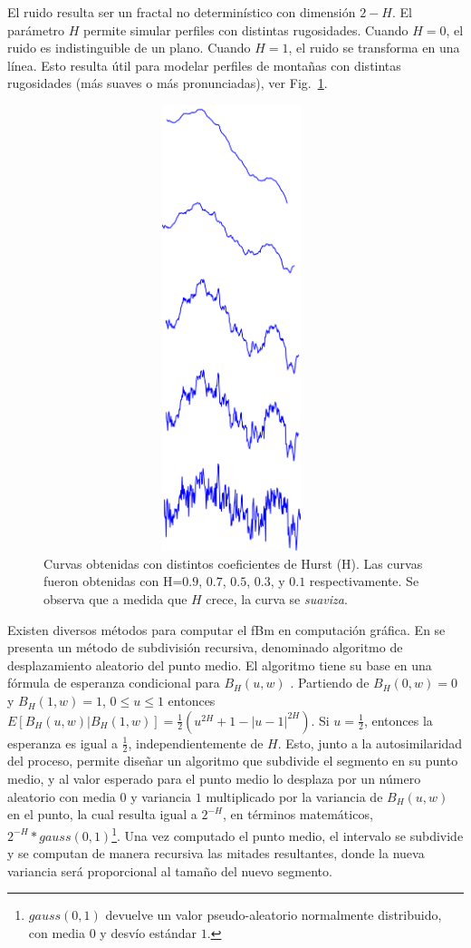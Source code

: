 El ruido resulta ser un fractal no determinístico con dimensión $2-H$.
El parámetro $H$ permite simular perfiles con distintas rugosidades.
Cuando $H = 0$, el ruido es indistinguible de un plano.
Cuando $H = 1$, el ruido se transforma en una línea.
Esto resulta útil para modelar perfiles de montañas con distintas rugosidades (más suaves o más pronunciadas), ver Fig.~\ref{fg:hurst}.

\begin{figure}
\center
\includegraphics[width=11cm,height=13cm]{figures/hurst}
\caption[Curvas obtenidas con distintos coeficientes de Hurst.]{Curvas obtenidas con distintos coeficientes de Hurst (H). Las curvas fueron obtenidas con H=$0.9$, $0.7$, $0.5$, $0.3$, y $0.1$ respectivamente. Se observa que a medida que $H$ crece, la curva se {\em suaviza}.}
\label{fg:hurst}
\end{figure}

Existen diversos métodos para computar el fBm en computación gráfica.
En \cite{Fournier1982} se presenta un método de subdivisión recursiva, denominado algoritmo de desplazamiento aleatorio del punto medio.
El algoritmo tiene su base en una fórmula de esperanza condicional para $B_{H}(u,w)$ \cite{Mandelbrot1968}.
Partiendo de $B_{H}(0,w) = 0$ y $B_{H}(1,w) = 1$, $0 \le u \le 1$ entonces $E[B_{H}(u,w)|B_{H}(1,w)] = \frac{1}{2} (u^{2H} + 1 - |u-1|^{2H})$.
Si $u=\frac{1}{2}$, entonces la esperanza es igual a $\frac{1}{2}$, independientemente de $H$.
Esto, junto a la autosimilaridad del proceso, permite diseñar un algoritmo que subdivide el segmento en su punto medio, y al valor esperado para el punto medio lo desplaza por un número aleatorio con media $0$ y variancia $1$ multiplicado por la variancia de $B_{H}(u,w)$ en el punto, la cual resulta igual a $2^{-H}$, en términos matemáticos, $2^{-H} * gauss(0,1) $\footnote{$gauss(0,1)$ devuelve un valor pseudo-aleatorio normalmente distribuido, con media $0$ y desvío estándar $1$. }.
Una vez computado el punto medio, el intervalo se subdivide y se computan de manera recursiva las mitades resultantes, donde la nueva variancia será proporcional al tamaño del nuevo segmento.

